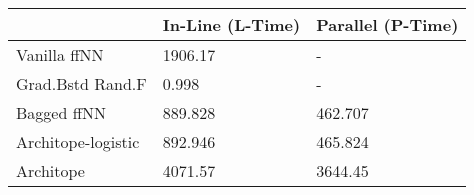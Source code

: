 \begin{tabular}{lll}
\toprule
{} & In-Line (L-Time) & Parallel (P-Time) \\
\midrule
Vanilla ffNN       &          1906.17 &                 - \\
Grad.Bstd Rand.F   &            0.998 &                 - \\
Bagged ffNN        &          889.828 &           462.707 \\
Architope-logistic &          892.946 &           465.824 \\
Architope          &          4071.57 &           3644.45 \\
\bottomrule
\end{tabular}
